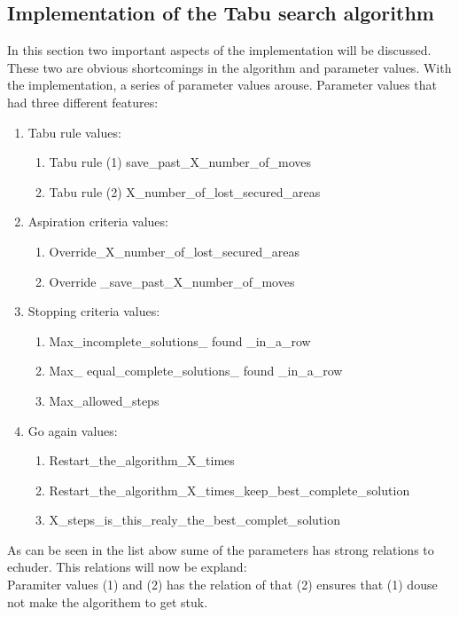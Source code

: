 \subsection{Implementation of the Tabu search algorithm}
In this section two important aspects of the implementation will be discussed. These two are obvious shortcomings in the algorithm and parameter values. With the implementation, a series of parameter values arouse. Parameter values that had three different features:
\begin{enumerate}
\item{} Tabu rule values:
\begin{enumerate}
\item{} Tabu rule (1)  save\_past\_X\_number\_of\_moves 
\item{} Tabu rule (2)  X\_number\_of\_lost\_secured\_areas
\end{enumerate} 
\item{} Aspiration criteria values:
\begin{enumerate}
\item{} Override\_X\_number\_of\_lost\_secured\_areas
\item{} Override \_save\_past\_X\_number\_of\_moves
\end{enumerate} 
\item{} Stopping criteria values:
\begin{enumerate}
\item{} Max\_incomplete\_solutions\_ found \_in\_a\_row
\item{} Max\_ equal\_complete\_solutions\_ found \_in\_a\_row
\item{} Max\_allowed\_steps
\end{enumerate} 
\item{} Go again values:
\begin{enumerate}
\item{} Restart\_the\_algorithm\_X\_times
\item{} Restart\_the\_algorithm\_X\_times\_keep\_best\_complete\_solution
\item{} X\_steps\_is\_this\_realy\_the\_best\_complet\_solution
\end{enumerate} 
\end{enumerate} 
As can be seen in the list abow sume of the parameters has strong relations to echuder. 
This relations will now be expland:\\
Paramiter values (1) and (2) has the relation of that (2) ensures that (1) douse not make the algorithem to get stuk.\\
